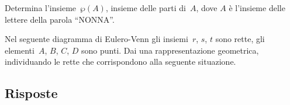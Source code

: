 \begin{esercizio}
\label{ese:5.137}
Determina l'insieme~$\wp(A)$, insieme delle parti di~$A$, dove $A$ è l'insieme delle lettere della parola ``NONNA''.
\end{esercizio}
\pagebreak
\begin{esercizio}
\label{ese:5.138}
Nel seguente diagramma di Eulero-Venn gli insiemi~$r$, $s$, $t$
sono rette, gli elementi~$A$, $B$, $C$, $D$ sono punti. Dai una
rappresentazione geometrica, individuando le rette che corrispondono
alla seguente situazione.

\begin{center}
 
\end{center}
\end{esercizio}

\subsection{Risposte}
